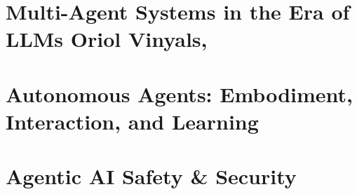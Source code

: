 \documentclass[a4paper]{article}
\begin{document}
\section{Multi-Agent Systems in the Era of LLMs Oriol Vinyals,}


\section{Autonomous Agents: Embodiment, Interaction, and Learning}


\section{Agentic AI Safety \& Security}

\end{document}
